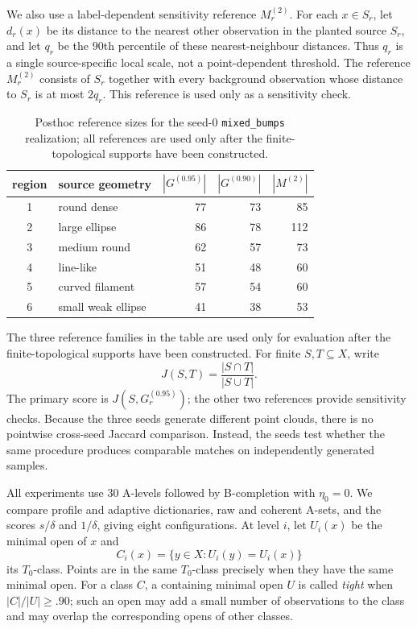 \documentclass[a4paper,11pt]{article}
\theoremstyle{definition}
\theoremstyle{remark}
\begin{document}
We also use a label-dependent sensitivity reference $M_r^{(2)}$. For each $x\in S_r$, let $d_r(x)$ be its distance to the nearest other observation in the planted source $S_r$, and let $q_r$ be the $90$th percentile of these nearest-neighbour distances. Thus $q_r$ is a single source-specific local scale, not a point-dependent threshold. The reference $M_r^{(2)}$ consists of $S_r$ together with every background observation whose distance to $S_r$ is at most $2q_r$. This reference is used only as a sensitivity check.

\begin{table}[!ht]
\centering
\small
\caption{Posthoc reference sizes for the seed-0 \texttt{mixed\_bumps} realization; all references are used only after the finite-topological supports have been constructed.}
\label{tab:mixed-bumps-reference-regions}
\begin{tabular}{@{}clrrr@{}}
\toprule
region & source geometry & $|G^{(0.95)}|$ & $|G^{(0.90)}|$ & $|M^{(2)}|$ \\
\midrule
1 & round dense & 77 & 73 & 85 \\
2 & large ellipse & 86 & 78 & 112 \\
3 & medium round & 62 & 57 & 73 \\
4 & line-like & 51 & 48 & 60 \\
5 & curved filament & 57 & 54 & 60 \\
6 & small weak ellipse & 41 & 38 & 53 \\
\bottomrule
\end{tabular}
\end{table}

The three reference families in the table are used only for evaluation after the finite-topological supports have been constructed. For finite $S,T\subseteq X$, write
$$
 J(S,T)=\frac{|S\cap T|}{|S\cup T|}.
$$
The primary score is $J(S,G_r^{(0.95)})$; the other two references provide sensitivity checks. Because the three seeds generate different point clouds, there is no pointwise cross-seed Jaccard comparison. Instead, the seeds test whether the same procedure produces comparable matches on independently generated samples.

All experiments use 30 A-levels followed by B-completion with $\eta_0=0$. We compare profile and adaptive dictionaries, raw and coherent A-sets, and the scores $s/\delta$ and $1/\delta$, giving eight configurations. At level $i$, let $U_i(x)$ be the minimal open of $x$ and
$$
 C_i(x)=\{y\in X:U_i(y)=U_i(x)\}
$$
its $T_0$-class.  Points are in the same $T_0$-class precisely when they have the same minimal open. For a class $C$, a containing minimal open $U$ is called \emph{tight} when $|C|/|U|\geq .90$; such an open may add a small number of observations to the class and may overlap the corresponding opens of other
classes.
\end{document}
